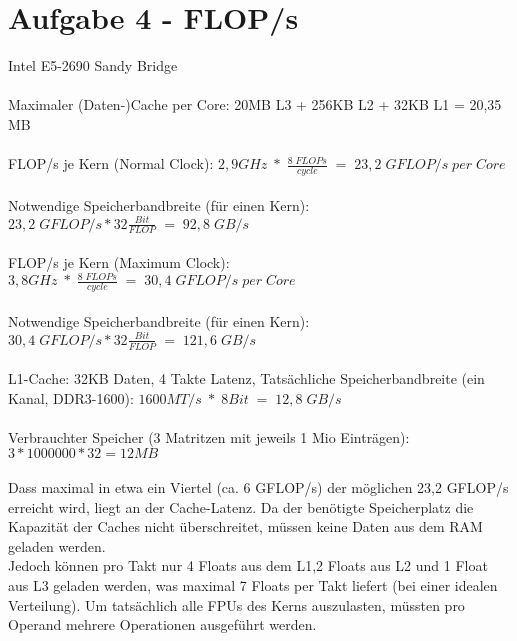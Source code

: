 \section{Aufgabe 4 - FLOP/s}
Intel E5-2690 Sandy Bridge \\\\
Maximaler (Daten-)Cache per Core: 20MB L3 + 256KB L2 + 32KB L1 = 20,35 MB \\\\
FLOP/s je Kern (Normal Clock): $2,9GHz\;*\;\frac{8\; FLOPs}{cycle}\; = \;23,2 \;GFLOP/s\; per\; Core$ \\\\
Notwendige Speicherbandbreite (für einen Kern): $23,2 \;GFLOP/s * 32 \frac{Bit}{FLOP} \;=\; 92,8 \;GB/s$ \\\\
FLOP/s je Kern (Maximum Clock): $3,8GHz\;*\;\frac{8\; FLOPs}{cycle}\; = \;30,4 \;GFLOP/s \; per \; Core$ \\\\
Notwendige Speicherbandbreite (für einen Kern): $30,4 \;GFLOP/s * 32 \frac{Bit}{FLOP} \;=\; 121,6\; GB/s$ \\\\
L1-Cache: 32KB Daten, 4 Takte Latenz, 
Tatsächliche Speicherbandbreite (ein Kanal, DDR3-1600): $1600MT/s\; *\; 8 Bit\; = \;12,8 \;GB/s$
\\\\
Verbrauchter Speicher (3 Matritzen mit jeweils 1 Mio Einträgen): $3 * 1000000 * 32 = 12MB$ \\\\
Dass maximal in etwa ein Viertel (ca. 6 GFLOP/s) der möglichen 23,2 GFLOP/s erreicht wird, liegt an der Cache-Latenz. Da der benötigte Speicherplatz die Kapazität der Caches nicht überschreitet, müssen keine Daten aus dem RAM geladen werden. \\
Jedoch können pro Takt nur 4 Floats aus dem L1,2 Floats aus L2 und 1 Float aus L3 geladen werden, was maximal 7 Floats per Takt liefert (bei einer idealen Verteilung). Um tatsächlich alle FPUs des Kerns auszulasten, müssten pro Operand mehrere Operationen ausgeführt werden.
\\\\

